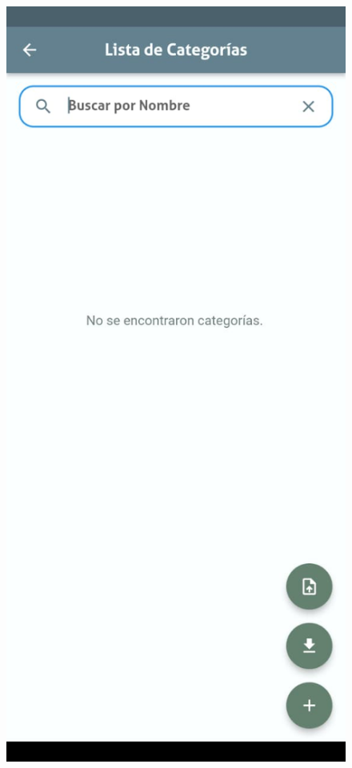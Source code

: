 \documentclass{article}
\begin{document}
\begin{figure}[H]
  \centering
  \begin{minipage}[b]{0.3\textwidth}
    \centering
    \includegraphics[width=\textwidth]{images/functionality_test/load_categories_1.jpg}

\end{minipage}
\end{figure}
\end{document}
